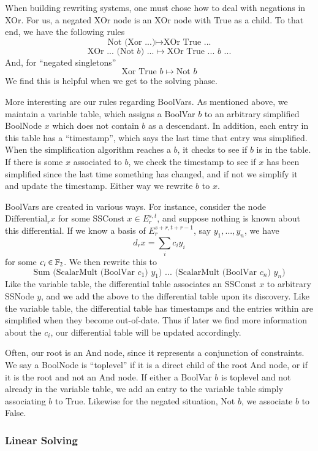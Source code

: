 When building rewriting systems, one must chose how to deal with negations in XOr.
For us, a negated XOr node is an XOr node with True as a child.
To that end, we have the following rules
\[\mbox{Not (Xor ...)} \mapsto \mbox{XOr True ...}\]
\[\mbox{XOr ... (Not $b$) ...} \mapsto\mbox{XOr True ... $b$ ...}\]
And, for ``negated singletons''
\[\mbox{Xor True $b$}\mapsto \mbox{Not $b$}\]
We find this is helpful when we get to the solving phase.  

More interesting are our rules regarding BoolVars.  
As mentioned above, we maintain a variable table, which assigns a BoolVar $b$ to an arbitrary simplified BoolNode $x$ which does not contain $b$ as a descendant.  
In addition, each entry in this table has a ``timestamp'', which says the last time that entry was simplified.  
When the simplification algorithm reaches a $b$, it checks to see if $b$ is in the table.
If there is some $x$ associated to $b$, we check the timestamp to see if $x$ has been simplified since the last time something has changed, and if not we simplify it and update the timestamp.
Either way we rewrite $b$ to $x$.

BoolVars are created in various ways.
For instance, consider the node $\mbox{Differential}_r x$ for some SSConst $x\in E_r^{s,t}$, and suppose nothing is known about this differential.
If we know a basis of $E_r^{s+r,t+r-1}$, say $y_1,...,y_n$, we have
\[d_rx = \sum_i c_iy_i\]
for some $c_i\in \mathbb{F}_2$.  
We then rewrite this to 
\[\mbox{Sum (ScalarMult (BoolVar $c_1$) $y_1$) ... (ScalarMult (BoolVar $c_n$) $y_n$)}\]
Like the variable table, the differential table associates an SSConst $x$ to arbitrary SSNode $y$, and we add the above to the differential table upon its discovery.
Like the variable table, the differential table has timestamps and the entries within are simplified when they become out-of-date.
Thus if later we find more information about the $c_i$, our differential table will be updated accordingly.  

Often, our root is an And node, since it represents a conjunction of constraints.  
We say a BoolNode is ``toplevel'' if it is a direct child of the root And node, or if it is the root and not an And node.
If either a BoolVar $b$ is toplevel and not already in the variable table, we add an entry to the variable table simply associating $b$ to True.
Likewise for the negated situation, Not $b$, we associate $b$ to False.


\subsubsection{Linear Solving}

